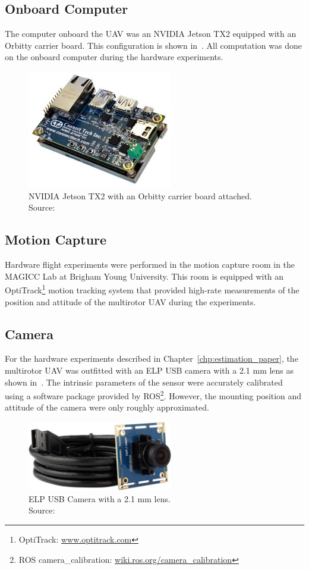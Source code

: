 \subsection{Onboard Computer}
The computer onboard the UAV was an NVIDIA Jetson TX2 equipped with an Orbitty
carrier board. This configuration is shown in~. All
computation was done on the onboard computer during the hardware experiments.

\begin{figure}[h]
  \centering
  \includegraphics[width=2.5in]{figures/tx2_orbitty.jpg}
  \caption[NVIDIA Jetson TX2 with Orbitty Carrier Board]{NVIDIA Jetson TX2
  with an Orbitty carrier board attached. \\\hspace{\textwidth} Source:~\cite{orbitty}
  }
  \label{fig:tx2_orbitty}
\end{figure}

\subsection{Motion Capture}
Hardware flight experiments were performed in the motion capture room in the
MAGICC Lab at Brigham Young University. This room is equipped with an OptiTrack\footnote{OptiTrack:
\url{www.optitrack.com}}
motion tracking system that
provided high-rate measurements of the position and attitude of the multirotor
UAV during the experiments.

\subsection{Camera}
For the hardware experiments described in Chapter~\ref{chp:estimation_paper},
the multirotor UAV was outfitted with an ELP USB camera with a 2.1 mm lens as
shown in~. The intrinsic parameters of the sensor were
accurately calibrated using a software package provided by ROS\footnote{ROS
camera\_calibration:
\url{wiki.ros.org/camera_calibration}}.
However, the mounting position and attitude of the camera were only roughly
approximated.

\begin{figure}[h]
  \centering
  \includegraphics[width=2.5in]{figures/camera.jpg}
  \caption[ELP USB Camera with 2.1 mm Lens]{ELP USB Camera with a 2.1 mm
    lens. \\ \hspace{\textwidth} Source:~\cite{webcam}
}
%
  \label{fig:camera}
\end{figure}

